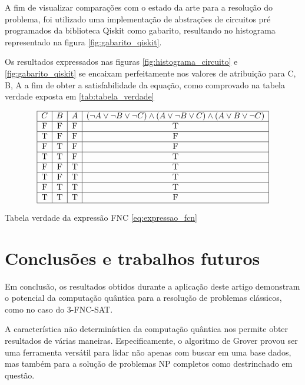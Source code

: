 \documentclass[12pt]{article}
\begin{document}
A fim de visualizar comparações com o estado da arte para a resolução do problema, foi utilizado uma implementação de abstrações de circuitos pré programados da biblioteca Qiskit como gabarito, resultando no histograma representado na figura \ref{fig:gabarito_qiskit}.

Os resultados expressados nas figuras  \ref{fig:histograma_circuito} e \ref{fig:gabarito_qiskit} se encaixam perfeitamente nos valores de atribuição para C, B, A a fim de obter a satisfabilidade da equação, como comprovado na tabela verdade exposta em \ref{tab:tabela_verdade}
\begin{table}[h!]
\centering
\[
\begin{array}{|c|c|c|c|}
\hline
C & B & A & (\neg A \lor \neg B \lor \neg C) \land (A \lor \neg B \lor C) \land (A \lor B \lor \neg C) \\
\hline
\text{F} & \text{F} & \text{F} & \text{T} \\
\hline
\text{T} & \text{F} & \text{F} & \text{F} \\
\hline
\text{F} & \text{T} & \text{F} & \text{F} \\
\hline
\text{T} & \text{T} & \text{F} & \text{T} \\
\hline
\text{F} & \text{F} & \text{T} & \text{T} \\
\hline
\text{T} & \text{F} & \text{T} & \text{T} \\
\hline
\text{F} & \text{T} & \text{T} & \text{T} \\
\hline
\text{T} & \text{T} & \text{T} & \text{F} \\
\hline
\end{array}
\]
\caption{Tabela verdade da expressão FNC \ref{eq:expressao_fcn}}
\label{tab:tabela_verdade}
\end{table}

\section{Conclusões e trabalhos futuros}


Em conclusão, os resultados obtidos durante a aplicação deste artigo demonstram o potencial da computação quântica para a resolução de problemas clássicos, como no caso do 3-FNC-SAT.

A característica não determinística da computação quântica nos permite obter resultados de várias maneiras. Especificamente, o algoritmo de Grover provou ser uma ferramenta versátil para lidar não apenas com buscar em uma base dados, mas também para a solução de problemas NP completos como destrinchado em questão.
\end{document}
